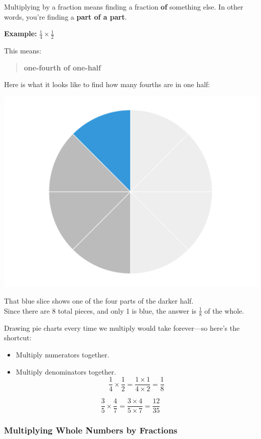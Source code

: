 \documentclass[
  letterpaper,
  DIV=11,
  numbers=noendperiod]{scrreprt}
\providecommand{\tightlist}{%
  \setlength{\itemsep}{0pt}\setlength{\parskip}{0pt}}
\begin{document}
Multiplying by a fraction means finding a fraction \textbf{of} something
else. In other words, you're finding a \textbf{part of a part}.

\textbf{Example:} \(\frac{1}{4} \times \frac{1}{2}\)

This means:

\begin{quote}
\textbf{one-fourth of one-half}
\end{quote}

Here is what it looks like to find how many fourths are in one half:

\includegraphics[width=0.5\linewidth,height=\textheight,keepaspectratio]{images/Unit_1/Lesson_5/fourth_of_a_half.png}

That blue slice shows one of the four parts of the darker half.\\
Since there are 8 total pieces, and only 1 is blue, the answer is
\(\frac{1}{8}\) of the whole.

Drawing pie charts every time we multiply would take forever---so here's
the shortcut:

\begin{itemize}
\tightlist
\item
  Multiply numerators together.
\item
  Multiply denominators together. \[
  \frac{1}{4} \times \frac{1}{2} = \frac{1 \times 1}{4 \times 2} = \frac{1}{8}
  \]
\end{itemize}

\[
\frac{3}{5} \times \frac{4}{7} = \frac{3 \times 4}{5 \times 7} = \frac{12}{35}
\]

\subsubsection*{\texorpdfstring{\textbf{Multiplying Whole Numbers by
Fractions}}{Multiplying Whole Numbers by Fractions}}\label{multiplying-whole-numbers-by-fractions}
\end{document}
